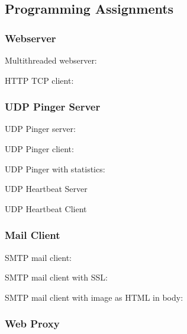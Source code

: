 \subsection{Programming Assignments}

\subsubsection{Webserver}

Multithreaded webserver:

HTTP TCP client:



\subsubsection{UDP Pinger Server}
UDP Pinger server:

UDP Pinger client:

UDP Pinger with statistics:

UDP Heartbeat Server

UDP Heartbeat Client



\subsubsection{Mail Client}
SMTP mail client:

SMTP mail client with SSL:

SMTP mail client with image as HTML in body:



\subsubsection{Web Proxy}
